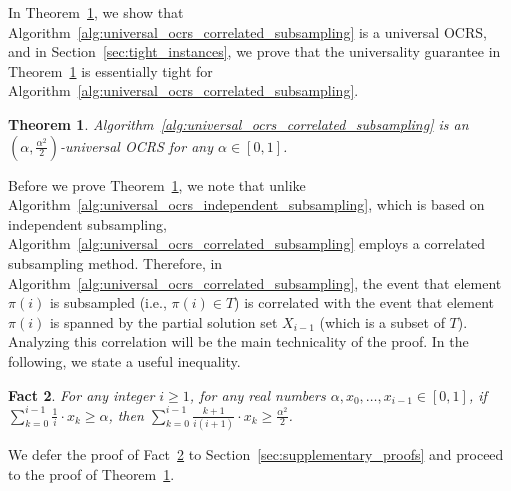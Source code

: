 \documentclass[11pt]{article}
\newtheorem{theorem}{Theorem}[section]
\newtheorem{fact}[theorem]{Fact}
\begin{document}
In Theorem~\ref{thm:universal_ocrs_correlated_subsampling}, we show that Algorithm~\ref{alg:universal_ocrs_correlated_subsampling} is a universal OCRS, and in Section~\ref{sec:tight_instances}, we prove that the universality guarantee in Theorem~\ref{thm:universal_ocrs_correlated_subsampling} is essentially tight for Algorithm~\ref{alg:universal_ocrs_correlated_subsampling}.
\begin{theorem}\label{thm:universal_ocrs_correlated_subsampling}
Algorithm~\ref{alg:universal_ocrs_correlated_subsampling} is an $(\alpha,\frac{\alpha^2}{2})$-universal OCRS for any $\alpha\in[0,1]$.
\end{theorem}
Before we prove Theorem~\ref{thm:universal_ocrs_correlated_subsampling}, we note that unlike Algorithm~\ref{alg:universal_ocrs_independent_subsampling}, which is based on independent subsampling, Algorithm~\ref{alg:universal_ocrs_correlated_subsampling} employs a correlated subsampling method. Therefore, in Algorithm~\ref{alg:universal_ocrs_correlated_subsampling}, the event that element $\pi(i)$ is subsampled (i.e., $\pi(i)\in T$) is correlated with the event that element $\pi(i)$ is spanned by the partial solution set $X_{i-1}$ (which is a subset of $T$). Analyzing this correlation will be the main technicality of the proof. In the following, we state a useful inequality.
\begin{fact}\label{fact:fractional_knapsack}
For any integer $i\ge1$, for any real numbers $\alpha,x_0,\dots,x_{i-1}\in[0,1]$, if $\sum_{k=0}^{i-1}\frac{1}{i}\cdot x_{k}\ge\alpha$, then $\sum_{k=0}^{i-1} \frac{k+1}{i(i+1)}\cdot x_{k}\ge\frac{\alpha^2}{2}$.
\end{fact}
We defer the proof of Fact~\ref{fact:fractional_knapsack} to Section~\ref{sec:supplementary_proofs} and proceed to the proof of Theorem~\ref{thm:universal_ocrs_correlated_subsampling}.
\end{document}
